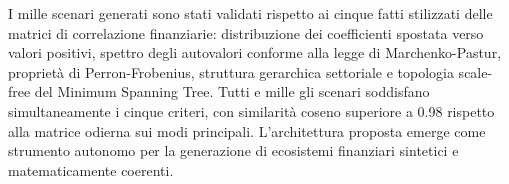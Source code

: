 I mille scenari generati sono stati validati rispetto ai cinque fatti stilizzati delle matrici di correlazione finanziarie: distribuzione dei coefficienti spostata verso valori positivi, spettro degli autovalori conforme alla legge di Marchenko-Pastur, proprietà di Perron-Frobenius, struttura gerarchica settoriale e topologia scale-free del Minimum Spanning Tree. Tutti e mille gli scenari soddisfano simultaneamente i cinque criteri, con similarità coseno superiore a 0.98 rispetto alla matrice odierna sui modi principali. L'architettura proposta emerge come strumento autonomo per la generazione di ecosistemi finanziari sintetici e matematicamente coerenti.
